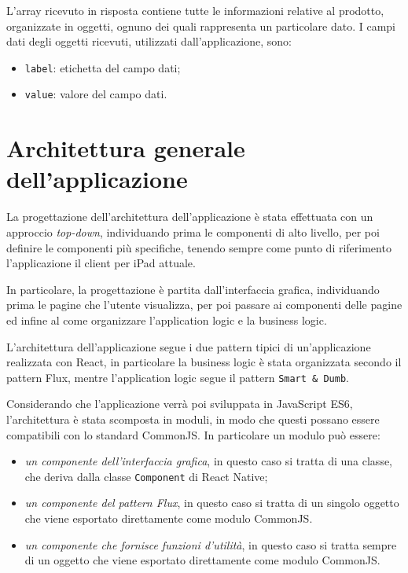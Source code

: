 L'array ricevuto in risposta contiene tutte le informazioni relative al prodotto, organizzate in oggetti, ognuno dei quali rappresenta un particolare dato. 
I campi dati degli oggetti ricevuti, utilizzati dall'applicazione, sono:
\begin{itemize}
\item \texttt{label}: etichetta del campo dati;
\item \texttt{value}: valore del campo dati.
\end{itemize}

\section{Architettura generale dell'applicazione}

La progettazione dell'architettura dell'applicazione è stata effettuata con un approccio \textit{top-down}, individuando prima le componenti di alto livello, per poi definire le componenti più specifiche, tenendo sempre come punto di riferimento l'applicazione il client per iPad attuale.

In particolare, la progettazione è partita dall'interfaccia grafica, individuando prima le pagine che l'utente visualizza, per poi passare ai componenti delle pagine ed infine al come organizzare l'application logic e la business logic.

L'architettura dell'applicazione segue i due pattern tipici di un'applicazione realizzata con React, in particolare la business logic è stata organizzata secondo il pattern Flux, mentre l'application logic segue il pattern \texttt{Smart \& Dumb}.

Considerando che l'applicazione verrà poi sviluppata in JavaScript ES6, l'architettura è stata scomposta in moduli, in modo che questi possano essere compatibili con lo standard CommonJS.
In particolare un modulo può essere:
\begin{itemize}
\item \textit{un componente dell'interfaccia grafica}, in questo caso si tratta di una classe, che deriva dalla classe \texttt{Component} di React Native;
\item \textit{un componente del pattern Flux}, in questo caso si tratta di un singolo oggetto che viene esportato direttamente come modulo CommonJS.
\item \textit{un componente che fornisce funzioni d'utilità}, in questo caso si tratta sempre di un oggetto che viene esportato direttamente come modulo CommonJS.
\end{itemize}

